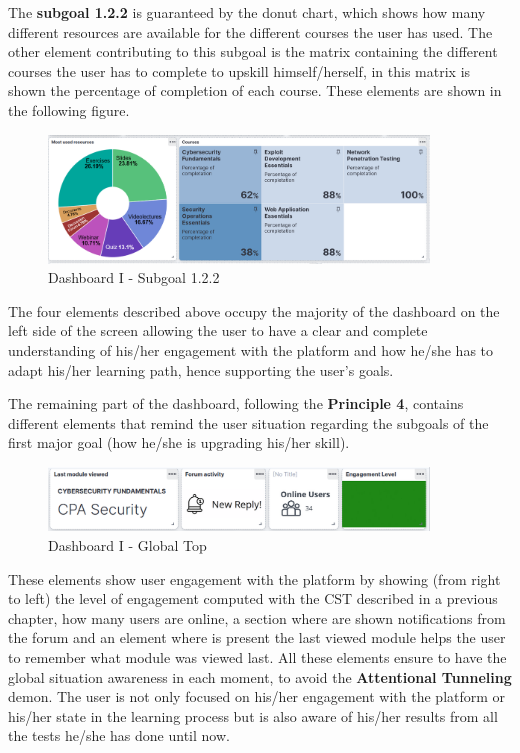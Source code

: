 The \textbf{subgoal 1.2.2} is guaranteed by the donut chart, which shows how many
different resources are available for the different courses the user has
used. The other element contributing to this subgoal is the matrix containing
the different courses the user has to complete to upskill himself/herself,
in this matrix is shown the percentage of completion of each course. These elements
are shown in the following figure.

\begin{figure}[H]
    \centering
    \includegraphics[width=0.9\textwidth]{assets/dashboard_1_122.png}
    \caption{Dashboard I - Subgoal 1.2.2}
    \label{fig:dashboard_1_subgoal_122}
\end{figure}

The four elements described above occupy the majority of the dashboard on 
the left side of the screen allowing the user to have a clear and complete
understanding of his/her engagement with the platform and how he/she has to
adapt his/her learning path, hence supporting the user's goals. 

The remaining part of the dashboard, following the
\textbf{Principle 4}, contains different elements that remind the user
situation regarding the subgoals of the first major goal (how he/she is upgrading 
his/her skill). 

\begin{figure}[H]
    \centering
    \includegraphics[width=0.9\textwidth]{assets/dashboard_1_globaltop.png}
    \caption{Dashboard I - Global Top}
    \label{fig:dashboard_1_global_top}
\end{figure}

These elements show user engagement with the platform by showing (from right to left)
the level of engagement computed with the CST described in a previous chapter,
how many users are online, a section
where are shown notifications from the forum 
and an element where is present the last viewed module helps the user
to remember what module was viewed last.
All these elements ensure to have the global situation awareness in each moment, 
to avoid the \textbf{Attentional Tunneling} demon. The user is not only focused
on his/her engagement with the platform or his/her state in the learning process but is
also aware of his/her results from all the tests he/she has done until now.

